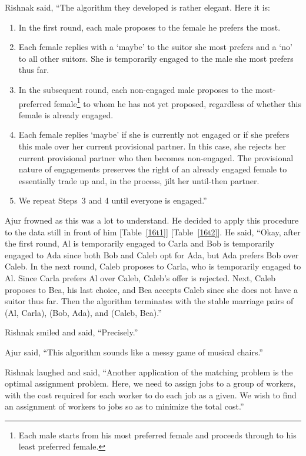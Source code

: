 Rishnak said, ``The algorithm they developed is rather elegant. Here it is:

\begin{enumerate}
    \item In the first round, each male proposes to the female he prefers the most.
    \item Each female replies with a `maybe' to the suitor she most prefers and a `no' to all other suitors. She is temporarily engaged to the male she most prefers thus far.
    \item In the subsequent round, each non-engaged male proposes to the most-preferred female\footnote{Each male starts from his most preferred female and proceeds through to his least preferred female.} to whom he has not yet proposed, regardless of whether this female is already engaged.
    \item Each female replies `maybe' if she is currently not engaged or if she prefers this male over her current provisional partner. In this case, she rejects her current provisional partner who then becomes non-engaged. The provisional nature of engagements preserves the right of an already engaged female to essentially trade up and, in the process, jilt her until-then partner.
   \item We repeat Steps~3 and 4 until everyone is engaged.''
\end{enumerate}

Ajur frowned as this was a lot to understand. He decided to apply this procedure to the data still in front of him [Table~\ref{16t1}] [Table~\ref{16t2}]. He said, ``Okay, after the first round, Al is temporarily engaged to Carla and Bob is temporarily engaged to Ada since both Bob and Caleb opt for Ada, but Ada prefers Bob over Caleb. In the next round, Caleb proposes to Carla, who is temporarily engaged to Al. Since Carla prefers Al over Caleb, Caleb's offer is rejected. Next, Caleb proposes to Bea, his last choice, and Bea accepts Caleb since she does not have a suitor thus far. Then the algorithm terminates with the stable marriage pairs of (Al, Carla), (Bob, Ada), and (Caleb, Bea).''

Rishnak smiled and said, ``Precisely.''

Ajur said, ``This algorithm sounds like a messy game of musical chairs.''

Rishnak laughed and said, ``Another application of the matching problem is the optimal assignment problem. Here, we need to assign jobs to a group of workers, with the cost required for each worker to do each job as a given. We wish to find an assignment of workers to jobs so as to minimize the total cost.''

